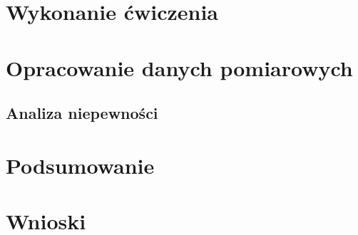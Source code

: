 \documentclass[a4paper,12pts]{article}
\begin{document}
	\section{Wykonanie ćwiczenia}
	
	
	\section{Opracowanie danych pomiarowych}
	
	
	\subsection{Analiza niepewności}
	

	\section{Podsumowanie}

	
	\section{Wnioski}
\end{document}
